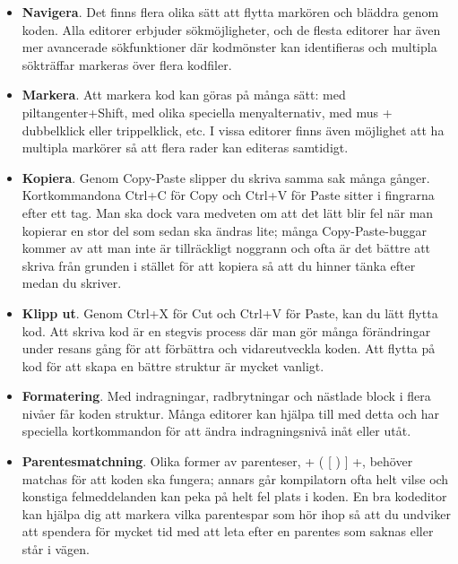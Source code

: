 \begin{itemize}
\item \textbf{Navigera}. Det finns flera olika sätt att flytta markören och bläddra genom koden. Alla editorer erbjuder sökmöjligheter, och de flesta editorer har även mer avancerade sökfunktioner där kodmönster kan identifieras och multipla sökträffar markeras över flera kodfiler.

\item \textbf{Markera}. Att markera kod kan göras på många sätt: med piltangenter+Shift, med olika speciella menyalternativ, med mus + dubbelklick eller trippelklick, etc. I vissa editorer finns även möjlighet att ha multipla markörer så att flera rader kan editeras samtidigt.

\item \textbf{Kopiera}. Genom Copy-Paste slipper du skriva samma sak många gånger. Kortkommandona Ctrl+C för Copy och Ctrl+V för Paste sitter i fingrarna efter ett tag. Man ska dock vara medveten om att det lätt blir fel när man kopierar en stor del som sedan ska ändras lite; många Copy-Paste-buggar kommer av att man inte är tillräckligt noggrann och ofta är det bättre att skriva från grunden i stället för att kopiera så att du hinner tänka efter medan du skriver.

\item \textbf{Klipp ut}. Genom Ctrl+X för Cut och Ctrl+V för Paste, kan du lätt flytta kod. Att skriva kod är en stegvis process där man gör många förändringar under resans gång för att förbättra och vidareutveckla koden. Att flytta på kod för att skapa en bättre struktur är mycket vanligt.

\item \textbf{Formatering}. Med indragningar, radbrytningar och nästlade block i flera nivåer får koden struktur. Många editorer kan hjälpa till med detta och har speciella kortkommandon för att ändra indragningsnivå inåt eller utåt.

\item \textbf{Parentesmatchning}. Olika former av parenteser, \code+ ( { [ ) } ] +,  behöver matchas för att koden ska fungera; annars går kompilatorn ofta helt vilse och konstiga felmeddelanden kan peka på helt fel plats i koden. En bra kodeditor kan hjälpa dig att markera vilka parentespar som hör ihop så att du undviker att spendera för mycket tid med att leta efter en parentes som saknas eller står i vägen.

\end{itemize}

